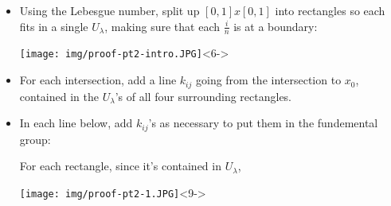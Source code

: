 \documentclass[8pt]{beamer}
\begin{document}
\begin{frame}
\begin{columns}
\begin{column}[T]{0.5\textwidth}
\begin{itemize}
        \end{itemize}
      \end{column}
      \begin{column}[T]{0.5\textwidth}
        \begin{itemize}
          \item<5-> Using the Lebesgue number, split up $[0,1]x[0,1]$ into rectangles
            so each fits in a single $U_\lambda$, making sure that each $\frac{i}{n}$ is at a boundary:
            \begin{center}
              \texttt{[image: img/proof-pt2-intro.JPG]}<6->
            \end{center}
          \item<7-> For each intersection, add a line $k_{ij}$ going from the intersection to $x_0$, contained in the $U_\lambda$'s of all four surrounding rectangles.
          \item<8-> In each line below, add $k_{ij}$'s as necessary to put them in the fundemental group:

            For each rectangle, since it's contained in $U_\lambda$,
            \begin{center}
              \texttt{[image: img/proof-pt2-1.JPG]}<9->
            \end{center}

          \end{itemize}
      \end{column}
    \end{columns}
  \end{frame}
\end{document}
